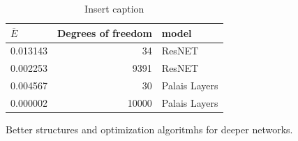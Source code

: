 \begin{table}
    \begin{tabular}{lrl}
        \toprule
        \(\bar{E} \) & Degrees of freedom & model         \\
        \midrule
        0.013143     & 34                 & ResNET        \\
        0.002253     & 9391               & ResNET        \\
        0.004567     & 30                 & Palais Layers \\
        0.000002     & 10000              & Palais Layers \\
        \bottomrule
    \end{tabular}
    \caption{Insert caption }
    \label{tab:comare_res_palais}
\end{table}

Better structures and optimization algoritmhs for deeper networks.